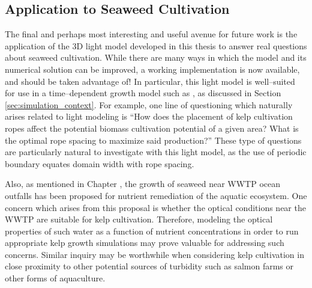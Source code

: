 \subsection{Application to Seaweed Cultivation}
The final and perhaps most interesting and useful avenue for future work is the application of the 3D light model developed in this thesis to answer real questions about seaweed cultivation.
While there are many ways in which the model and its numerical solution can be improved, a working implementation is now available, and should be taken advantage of!
In particular, this light model is well--suited for use in a time--dependent growth model such as \cite{broch_modelling_2012}, as discussed in Section \ref{sec:simulation_context}.
For example, one line of questioning which naturally arises related to light modeling is ``How does the placement of kelp cultivation ropes affect the potential biomass cultivation potential of a given area?
What is the optimal rope spacing to maximize said production?''
These type of questions are particularly natural to investigate with this light model, as the use of periodic boundary equates domain width with rope spacing.

Also, as mentioned in Chapter \Rom{\ref{chap:introduction}}, the growth of seaweed near WWTP ocean outfalls has been proposed for nutrient remediation of the aquatic ecosystem.
One concern which arises from this proposal is whether the optical conditions near the WWTP are suitable for kelp cultivation.
Therefore, modeling the optical properties of such water as a function of nutrient concentrations in order to run appropriate kelp growth simulations may prove valuable for addressing such concerns.
Similar inquiry may be worthwhile when considering kelp cultivation in close proximity to other potential sources of turbidity such as salmon farms \cite{broch_modelling_2013} or other forms of aquaculture.
